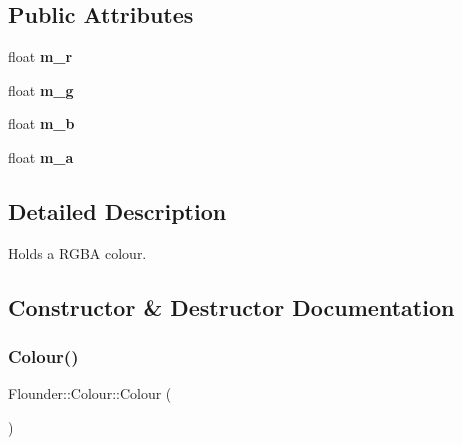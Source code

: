 \subsection*{Public Attributes}
\begin{DoxyCompactItemize}
\item 
\mbox{\label{class_flounder_1_1_colour_aa8c4badf5c9164200e7df260510b330b}} 
float {\bfseries m\+\_\+r}
\item 
\mbox{\label{class_flounder_1_1_colour_aab4b26a96fc92ea5916348b1a7312464}} 
float {\bfseries m\+\_\+g}
\item 
\mbox{\label{class_flounder_1_1_colour_aaaf91c2bcf6dc76d828159d117371e0f}} 
float {\bfseries m\+\_\+b}
\item 
\mbox{\label{class_flounder_1_1_colour_aae7e00300a925a8282dd85b72cfaad19}} 
float {\bfseries m\+\_\+a}
\end{DoxyCompactItemize}


\subsection{Detailed Description}
Holds a R\+G\+BA colour. 



\subsection{Constructor \& Destructor Documentation}
\mbox{\label{class_flounder_1_1_colour_a2cfe1397d03186a379eaa91c32713bc0}} 
\subsubsection{\texorpdfstring{Colour()}{Colour()}\hspace{0.1cm}{\footnotesize\ttfamily [1/6]}}
{\footnotesize\ttfamily Flounder\+::\+Colour\+::\+Colour (\begin{DoxyParamCaption}{ }\end{DoxyParamCaption})}



